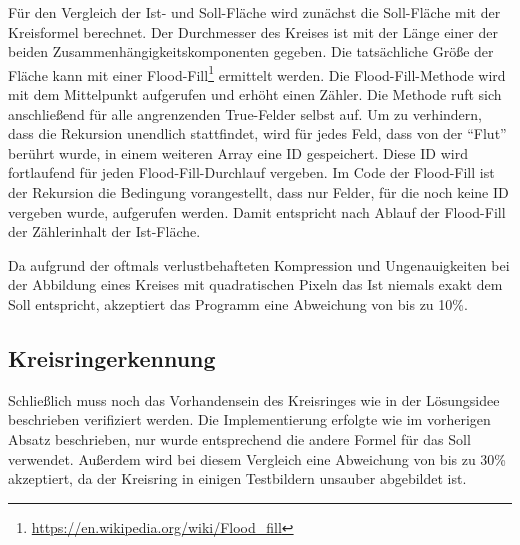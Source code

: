 Für den Vergleich der Ist- und Soll-Fläche wird zunächst die Soll-Fläche mit der Kreisformel berechnet. Der Durchmesser des Kreises ist mit der Länge einer der beiden Zusammenhängigkeitskomponenten gegeben. Die tatsächliche Größe der Fläche kann mit einer Flood-Fill\footnote{\url{https://en.wikipedia.org/wiki/Flood_fill}} ermittelt werden.
Die Flood-Fill-Methode wird mit dem Mittelpunkt aufgerufen und erhöht einen Zähler. Die Methode ruft sich anschließend für alle angrenzenden True-Felder selbst auf. Um zu verhindern, dass die Rekursion unendlich stattfindet, wird für jedes Feld, dass von der "`Flut"' berührt wurde, in einem weiteren Array eine ID gespeichert. Diese ID wird fortlaufend für jeden Flood-Fill-Durchlauf vergeben. Im Code der Flood-Fill ist der Rekursion die Bedingung vorangestellt, dass nur Felder, für die noch keine ID vergeben wurde, aufgerufen werden. Damit entspricht nach Ablauf der Flood-Fill der Zählerinhalt der Ist-Fläche.

Da aufgrund der oftmals verlustbehafteten Kompression und Ungenauigkeiten bei der Abbildung eines Kreises mit quadratischen Pixeln das Ist niemals exakt dem Soll entspricht, akzeptiert das Programm eine Abweichung von bis zu 10\%. 

\subsection{Kreisringerkennung}
Schließlich muss noch das Vorhandensein des Kreisringes wie in der Lösungsidee beschrieben verifiziert werden. Die Implementierung erfolgte wie im vorherigen Absatz beschrieben, nur wurde entsprechend die andere Formel für das Soll verwendet. Außerdem wird bei diesem Vergleich eine Abweichung von bis zu 30\% akzeptiert, da der Kreisring in einigen Testbildern unsauber abgebildet ist.

\pagebreak
